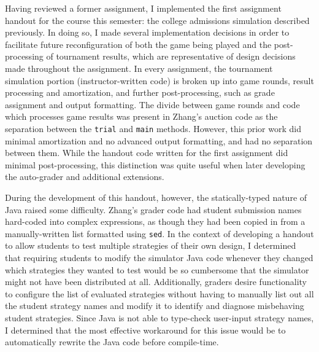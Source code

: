 \documentclass[pageno]{jpaper}
\begin{document}
Having reviewed a former assignment, I implemented the first assignment handout for the course this semester: the college admissions simulation described previously.
In doing so, I made several implementation decisions in order to facilitate future reconfiguration of both the game being played and the post-processing of tournament results, which are representative of design decisions made throughout the assignment.
In every assignment, the tournament simulation portion (instructor-written code) is broken up into game rounds, result processing and amortization, and further post-processing, such as grade assignment and output formatting.
The divide between game rounds and code which processes game results was present in Zhang's auction code as the separation between the \texttt{trial} and \texttt{main} methods.
However, this prior work did minimal amortization and no advanced output formatting, and had no separation between them.
While the handout code written for the first assignment did minimal post-processing, this distinction was quite useful when later developing the auto-grader and additional extensions.

During the development of this handout, however, the statically-typed nature of Java raised some difficulty.
Zhang's grader code had student submission names hard-coded into complex expressions, as though they had been copied in from a manually-written list formatted using \texttt{sed}.
In the context of developing a handout to allow students to test multiple strategies of their own design, I determined that requiring students to modify the simulator Java code whenever they changed which strategies they wanted to test would be so cumbersome that the simulator might not have been distributed at all.
Additionally, graders desire functionality to configure the list of evaluated strategies without having to manually list out all the student strategy names and modify it to identify and diagnose misbehaving student strategies.
Since Java is not able to type-check user-input strategy names, I determined that the most effective workaround for this issue would be to automatically rewrite the Java code before compile-time.
\end{document}
